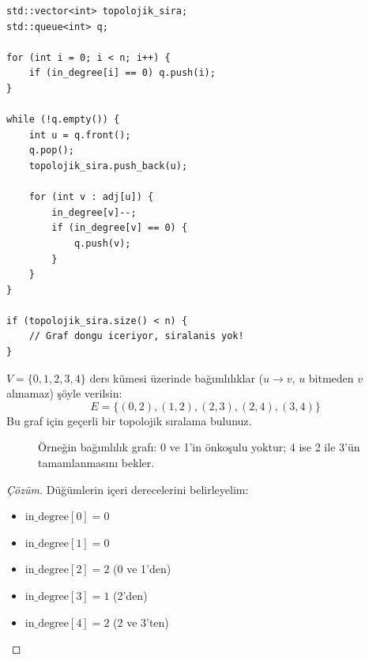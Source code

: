 \begin{lstlisting}[language=CTemel]
std::vector<int> topolojik_sira;
std::queue<int> q;

for (int i = 0; i < n; i++) {
    if (in_degree[i] == 0) q.push(i);
}

while (!q.empty()) {
    int u = q.front();
    q.pop();
    topolojik_sira.push_back(u);
    
    for (int v : adj[u]) {
        in_degree[v]--;
        if (in_degree[v] == 0) {
            q.push(v);
        }
    }
}

if (topolojik_sira.size() < n) {
    // Graf dongu iceriyor, siralanis yok!
}
\end{lstlisting}

\begin{example}
$V = \{0, 1, 2, 3, 4\}$ ders kümesi üzerinde bağımlılıklar ($u \to v$, $u$ bitmeden $v$ alınamaz) şöyle verilsin:
\[
E = \{(0, 2), (1, 2), (2, 3), (2, 4), (3, 4)\}
\]
Bu graf için geçerli bir topolojik sıralama bulunuz.

\begin{figure}[ht]
\centering
{}
\caption{Örneğin bağımlılık grafı: 0 ve 1'in önkoşulu yoktur; 4 ise 2 ile 3'ün
tamamlanmasını bekler.}
\end{figure}

\begin{proof}[Çözüm]
Düğümlerin içeri derecelerini belirleyelim:
\begin{itemize}
    \item $\text{in\_degree}[0] = 0$
    \item $\text{in\_degree}[1] = 0$
    \item $\text{in\_degree}[2] = 2$ (0 ve 1'den)
    \item $\text{in\_degree}[3] = 1$ (2'den)
    \item $\text{in\_degree}[4] = 2$ (2 ve 3'ten)
\end{itemize}


\end{proof}
\end{example}
